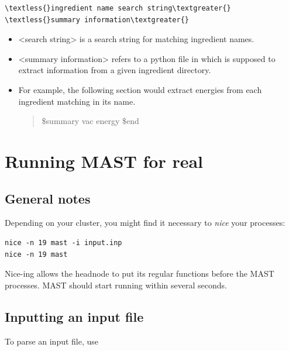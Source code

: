 \documentclass[letterpaper,10pt,english]{sphinxmanual}
\begin{document}
\begin{Verbatim}[commandchars=\\\{\}]
\textless{}ingredient name search string\textgreater{} \textless{}summary information\textgreater{}
\end{Verbatim}
\begin{itemize}
\item {} 
\textless{}search string\textgreater{} is a search string for matching ingredient names.

\item {} 
\textless{}summary information\textgreater{} refers to a python file in  which is supposed to extract information from a given ingredient directory.

\item {} 
For example, the following section would extract energies from each ingredient matching  in its name.
\begin{quote}

\$summary
vac energy
\$end
\end{quote}

\end{itemize}


\chapter{Running MAST for real}
\label{5_0_runningmast:running-mast-for-real}\label{5_0_runningmast::doc}

\section{General notes}
\label{5_0_runningmast:general-notes}
Depending on your cluster, you might find it necessary to \emph{nice} your processes:

\begin{Verbatim}[commandchars=\\\{\}]
nice -n 19 mast -i input.inp
nice -n 19 mast
\end{Verbatim}

Nice-ing allows the headnode to put its regular functions before the MAST processes. MAST should start running within several seconds.


\section{Inputting an input file}
\label{5_0_runningmast:inputting-an-input-file}
To parse an input file, use
\end{document}

